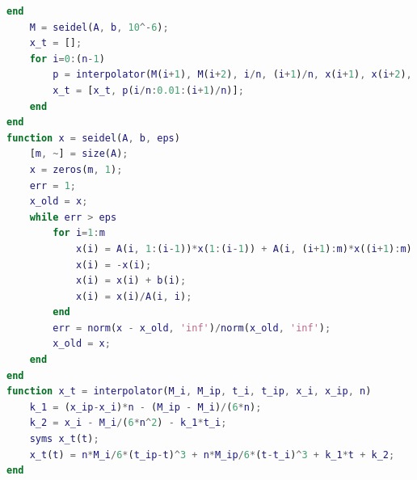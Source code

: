 \documentclass{article}
\begin{document}
\begin{lstlisting}[language=Matlab]
    end
    M = seidel(A, b, 10^-6);
    x_t = [];
    for i=0:(n-1)
        p = interpolator(M(i+1), M(i+2), i/n, (i+1)/n, x(i+1), x(i+2), n);
        x_t = [x_t, p(i/n:0.01:(i+1)/n)];
    end
end
function x = seidel(A, b, eps)
    [m, ~] = size(A);
    x = zeros(m, 1);
    err = 1;
    x_old = x;
    while err > eps
        for i=1:m
            x(i) = A(i, 1:(i-1))*x(1:(i-1)) + A(i, (i+1):m)*x((i+1):m);
            x(i) = -x(i);
            x(i) = x(i) + b(i);
            x(i) = x(i)/A(i, i);
        end
        err = norm(x - x_old, 'inf')/norm(x_old, 'inf');
        x_old = x;
    end
end
function x_t = interpolator(M_i, M_ip, t_i, t_ip, x_i, x_ip, n)
    k_1 = (x_ip-x_i)*n - (M_ip - M_i)/(6*n);
    k_2 = x_i - M_i/(6*n^2) - k_1*t_i;
    syms x_t(t);
    x_t(t) = n*M_i/6*(t_ip-t)^3 + n*M_ip/6*(t-t_i)^3 + k_1*t + k_2;
end
        \end{lstlisting}
\end{document}

